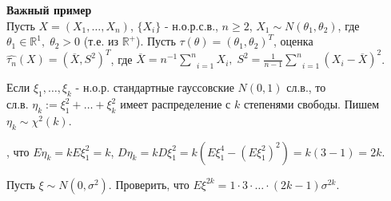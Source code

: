 \noindent\textbf{Важный пример}\\
Пусть $X = (X_1, \dots, X_n)$, $\{X_i\}$ - н.о.р.с.в., $n \ge 2$, $X_1 \sim N(\theta_1, \theta_2)$, где $\theta_1 \in \mathbb{R}^1, \; \theta_2 > 0$ (т.е. из $\mathbb{R}^{+}$). Пусть $\tau (\theta) = (\theta_1, \theta_2)^T$, оценка $\hat{\tau_n} (X) = (\overline{X}, S^2)^T$, где $\overline{X} = n^{-1} \underset{i=1}{\overset{n}{\sum}}X_i, \; S^2 = \frac{1}{n-1} \underset{i=1}{\overset{n}{\sum}}(X_i - \overline{X})^2$.

\begin{definition}\label{lec:5/def:3}
	Если $\xi_1, \dots, \xi_k$ - н.о.р. стандартные гауссовские $N(0,1)$ сл.в., то $\displaystyle \text{сл.в. } \eta_k := \xi_1^2 + \dots + \xi_k^2$ имеет распределение  с $k$ степенями свободы. Пишем $\eta_k \sim \chi^2 (k)$.
\end{definition}

, что $E \eta_k = k E \xi_1^2 = k$, $D \eta_k = k D \xi_1^2 = k \left( E \xi_1^4 - (E \xi_1^2)^2 \right) = k (3 - 1) = 2 k$.

\begin{problem}
	Пусть $\xi \sim N(0, \sigma^2)$. Проверить, что $E \xi^{2k} = 1 \cdot 3 \cdot \dots \cdot (2k-1) \sigma^{2k}$.
\end{problem}


